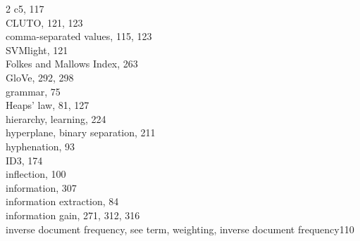 \documentclass[twoside,11pt]{book}
\begin{document}
\begin{multicols}{2}
c5, 117\\
CLUTO, 121, 123\\
comma-separated values, 115, 123\\
SVMlight, 121\\
Folkes and Mallows Index, 263\\
GloVe, 292, 298\\
grammar, 75\\
Heaps' law, 81, 127\\
hierarchy, learning, 224\\
hyperplane, binary separation, 211\\
hyphenation, 93\\
ID3, 174\\
inflection, 100\\
information, 307\\
information extraction, 84\\
information gain, 271, 312, 316\\
inverse document frequency, see term, weighting, inverse document frequency110


\end{multicols}
\end{document}
